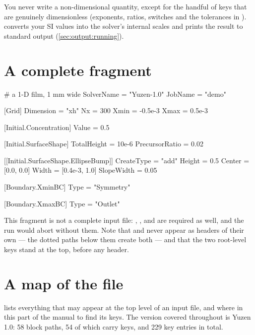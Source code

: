 You never write a non-dimensional quantity, except for the handful of keys
that are genuinely dimensionless (exponents, ratios, switches and the
tolerances in ).  converts
your SI values into the solver's internal scales and prints the result to
standard output (\cref{sec:output:running}).

\section{A complete fragment}
\label{sec:inputformat:example}

\begin{toml}
# a 1-D film, 1 mm wide
SolverName = "Yuzen-1.0"
JobName    = "demo"

[Grid]
Dimension = "xh"
Nx        = 300
Xmin      = -0.5e-3
Xmax      = 0.5e-3

[Initial.Concentration]
Value = 0.5

[Initial.SurfaceShape]
TotalHeight    = 10e-6
PrecursorRatio = 0.02

[[Initial.SurfaceShape.EllipseBump]]
CreateType = "add"
Height     = 0.5
Center     = [0.0, 0.0]
Width      = [0.4e-3, 1.0]
SlopeWidth = 0.05

[Boundary.XminBC]
Type = "Symmetry"

[Boundary.XmaxBC]
Type = "Outlet"
\end{toml}

This fragment is not a complete input file: , ,
 and  are required as well, and the run would abort
without them. Note that \code{[Initial]} and \code{[Boundary]} never appear as
headers of their own --- the dotted paths below them create both --- and that
the two root-level keys stand at the top, before any header.

\section{A map of the file}
\label{sec:inputformat:map}

 lists everything that may appear at the top level of an
input file, and where in this part of the manual to find its keys. The
version covered throughout is Yuzen 1.0: 58 block paths, 54 of which carry
keys, and 229 key entries in total.

